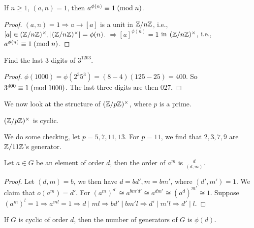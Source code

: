 \documentclass{mynotes}
\begin{document}
\begin{corollary}
	If $n\ge1$, $(a,n) = 1$, then $a^{\phi(n)}\equiv 1\;(\mbox{mod}{\;n})$.
\end{corollary}
\begin{proof}
	$(a,n) = 1 \Rightarrow a\rightarrow[a]$ is a unit in $\mathbb{Z}/n\mathbb{Z}$, i.e., $[a]\in(\mathbb{Z}/n\mathbb{Z})^{\times},|(\mathbb{Z}/n\mathbb{Z})^{\times}| = \phi(n).$
	$\Rightarrow [a]^{\phi(n)}=1$ in $(\mathbb{Z}/n\mathbb{Z})^{\times}$,
	i.e., $a^{\phi(n)}\equiv 1\;(\mbox{mod}{\;n})$.
\end{proof}
\begin{exercise}
	Find the last $3$ digits of $3^{1203}$.
\end{exercise}
\begin{proof}
	$\phi(1000) = \phi(2^3 5^3) = (8-4)(125-25) = 400$. So $3^{400}\equiv 1\;(\mbox{mod}{\;1000})$. The last three digits are then $027$.
\end{proof}
We now look at the structure of $(\mathbb{Z}/p\mathbb{Z})^{\times}$, where $p$ is a prime.
\begin{theorem}
	$(\mathbb{Z}/p\mathbb{Z})^{\times}$ is cyclic.
\end{theorem}
We do some checking, let $p=5,7,11,13$. For $p=11$, we find that $2,3,7,9$ are $\mathbb{Z}/11\mathbb{Z}$'s generator.
\begin{lemma}
	Let $a\in G$ be an element of order $d$, then the order of $a^m$ is $\frac{d}{(d,m)}$.
\end{lemma}
\begin{proof}
	Let $(d,m) = b$, we then have $d = bd', m = bm'$, where $(d',m') = 1$. We claim that $o(a^m) = d'$. For $(a^m)^{d'} \cong a^{bm'd'}\cong a^{dm'}\cong (a^d)^{m'}\cong 1$. Suppose $(a^m)^{l} = 1\Rightarrow a^{ml} = 1\Rightarrow d\mid ml \Rightarrow bd'\mid bm'l \Rightarrow d'\mid m' l\Rightarrow d'\mid l$.
\end{proof}
\begin{corollary}
	If $G$ is cyclic of order $d$, then the number of generators of $G$ is $\phi(d)$.
\end{corollary}
\end{document}
